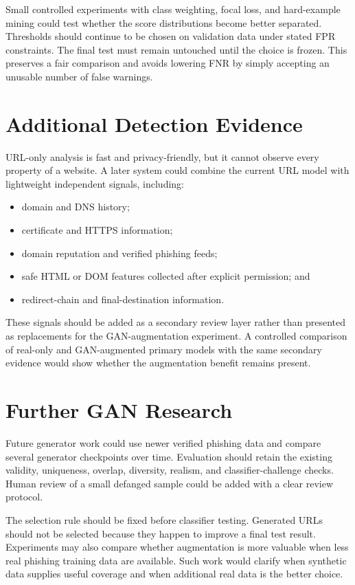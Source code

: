 Small controlled experiments with class weighting, focal loss, and hard-example
mining could test whether the score distributions become better separated.
Thresholds should continue to be chosen on validation data under stated FPR
constraints. The final test must remain untouched until the choice is frozen.
This preserves a fair comparison and avoids lowering FNR by simply accepting an
unusable number of false warnings.

\section{Additional Detection Evidence}

URL-only analysis is fast and privacy-friendly, but it cannot observe every
property of a website. A later system could combine the current URL model with
lightweight independent signals, including:

\begin{itemize}
\item domain and DNS history;
\item certificate and HTTPS information;
\item domain reputation and verified phishing feeds;
\item safe HTML or DOM features collected after explicit permission; and
\item redirect-chain and final-destination information.
\end{itemize}

These signals should be added as a secondary review layer rather than presented
as replacements for the GAN-augmentation experiment. A controlled comparison
of real-only and GAN-augmented primary models with the same secondary evidence
would show whether the augmentation benefit remains present.

\section{Further GAN Research}

Future generator work could use newer verified phishing data and compare
several generator checkpoints over time. Evaluation should retain the existing
validity, uniqueness, overlap, diversity, realism, and classifier-challenge
checks. Human review of a small defanged sample could be added with a clear
review protocol.

The selection rule should be fixed before classifier testing. Generated URLs
should not be selected because they happen to improve a final test result.
Experiments may also compare whether augmentation is more valuable when less
real phishing training data are available. Such work would clarify when
synthetic data supplies useful coverage and when additional real data is the
better choice.

